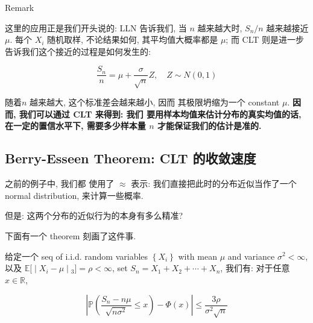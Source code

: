 \begin{example}[(样本量需求的计算)]
\begin{qlremark}{Remark}

这里的应用正是我们开头说的: LLN 告诉我们, 当 \(\mathit{n}\) 越来越大时, \(\mathit{S}_{\mathit{n}}/\mathit{n}\) 越来越接近 \(\mathit{\mu}\). 每个 \(\mathit{X}_{\mathit{i}}\) 随机取样, 不论结果如何, 其平均值大概率都是 \(\mathit{\mu}\); 而 CLT 则是进一步告诉我们这个接近的过程是如何发生的:

\[\frac{\mathit{S}_{\mathit{n}}}{\mathit{n}} = \mathit{\mu} + \frac{\mathit{\sigma}}{\sqrt{\mathit{n}}}\mathit{Z},\quad\mathit{Z} \sim \mathit{N}(0,1)\]

随着\(\mathit{n}\) 越来越大, 这个标准差会越来越小, 因而 其极限坍缩为一个 constant \(\mathit{\mu}\). \textbf{因而, 我们可以通过 CLT 来得到: 我们 要用样本均值来估计分布的真实均值的话, 在一定的置信水平下, 需要多少样本量 \(\mathit{n}\) 才能保证我们的估计是准的.}

\end{qlremark}

\end{example}

\subsection{Berry-Esseen Theorem: CLT 的收敛速度}\label{berry-esseen-theorem-clt-ux7684ux6536ux655bux901fux5ea6}

之前的例子中, 我们都 使用了 \(\approx\) 表示: 我们直接把此时的分布近似当作了一个 normal distribution, 来计算一些概率.

但是: 这两个分布的近似行为的本身有多么精准?

下面有一个 theorem 刻画了这件事.

\begin{theorem}{}

给定一个 seq of i.i.d. random variables \(\left\{ \mathit{X}_{\mathit{i}} \right\}\) with mean \(\mathit{\mu}\) and variance \(\mathit{\sigma}^{2} < \infty\), 以及 \(\left. \mathbb{E}\lbrack \middle| \mathit{X}_{\mathit{i}} - \mathit{\mu} \middle| {}_{3}\rbrack = \mathit{\rho} < \infty \right.\), set \(\mathit{S}_{\mathit{n}} = \mathit{X}_{1} + \mathit{X}_{2} + \cdots + \mathit{X}_{\mathit{n}}\), 我们有: 对于任意 \(\mathit{x} \in \mathbb{R}\),

\[\left| {\mathbb{P}\left( {\frac{\mathit{S}_{\mathit{n}} - \mathit{n}\mathit{\mu}}{\sqrt{\mathit{n}\mathit{\sigma}^{2}}} \leq \mathit{x}} \right) - \Phi(\mathit{x})} \right| \leq \frac{3\mathit{\rho}}{\mathit{\sigma}^{2}\sqrt{\mathit{n}}}\]

\end{theorem}

